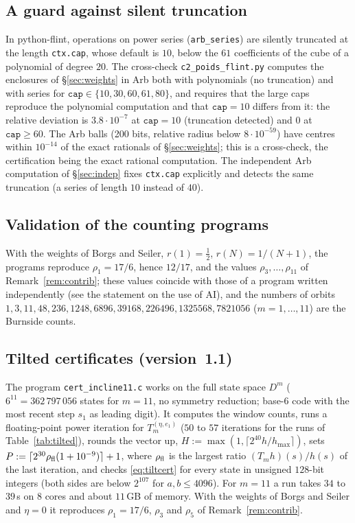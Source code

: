 \documentclass[11pt,a4paper]{article}
\theoremstyle{plain}
\theoremstyle{remark}
\numberwithin{equation}{section}
\begin{document}
\subsection{A guard against silent truncation}\label{sec:guard}
In python-flint, operations on power series (\texttt{arb\_series}) are silently truncated at the length \texttt{ctx.cap}, whose
default is $10$, below the $61$ coefficients of the cube of a polynomial of degree $20$. The cross-check \texttt{c2\_poids\_flint.py}
computes the enclosures of \S\ref{sec:weights} in Arb both with polynomials (no truncation) and with series for
$\texttt{cap}\in\{10,30,60,61,80\}$, and requires that the large caps reproduce the polynomial computation and that $\texttt{cap}=10$
differs from it: the relative deviation is $3.8\cdot10^{-7}$ at $\texttt{cap}=10$ (truncation detected) and $0$ at
$\texttt{cap}\ge60$. The Arb balls (200 bits, relative radius below $8\cdot10^{-59}$) have centres within $10^{-14}$ of the exact
rationals of \S\ref{sec:weights}; this is a cross-check, the certification being the exact rational computation. The independent Arb
computation of \S\ref{sec:indep} fixes \texttt{ctx.cap} explicitly and detects the same truncation (a series of length $10$ instead of
$40$).

\subsection{Validation of the counting programs}
With the weights of Borgs and Seiler, $r(1)=\frac12$, $r(N)=1/(N+1)$, the programs reproduce $\rho_1=17/6$, hence $12/17$, and the
values $\rho_3,\dots,\rho_{11}$ of Remark~\ref{rem:contrib}; these values coincide with those of a program written independently
(see the statement on the use of AI), and the numbers of orbits $1,3,11,48,236,1248,6896,39168,226496,1325568,7821056$ ($m=1,\dots,11$) are the Burnside
counts.

\subsection{Tilted certificates (version~1.1)}\label{sec:tiltcap}
The program \texttt{cert\_incline11.c} works on the full state space $D^{m}$ ($6^{11}=362\,797\,056$ states for $m=11$, no symmetry
reduction; base-$6$ code with the most recent step $s_1$ as leading digit). It computes the window counts, runs a floating-point power
iteration for $T_m^{(\eta,e_1)}$ ($50$ to $57$ iterations for the runs of Table~\ref{tab:tilted}), rounds the vector up,
$H:=\max(1,\lceil2^{40}h/h_{\max}\rceil)$, sets $P:=\lceil2^{30}\rho_{\rm fl}(1+10^{-9})\rceil+1$, where $\rho_{\rm fl}$ is the largest ratio
$(T_mh)(s)/h(s)$ of the last iteration, and checks \eqref{eq:tiltcert} for every state in unsigned $128$-bit integers (both sides are
below $2^{107}$ for $a,b\le4096$). For $m=11$ a run takes $34$ to $39$\,s on $8$ cores and about $11$\,GB of memory. With the weights of
Borgs and Seiler and $\eta=0$ it reproduces $\rho_1=17/6$, $\rho_3$ and $\rho_5$ of Remark~\ref{rem:contrib}.
\end{document}
